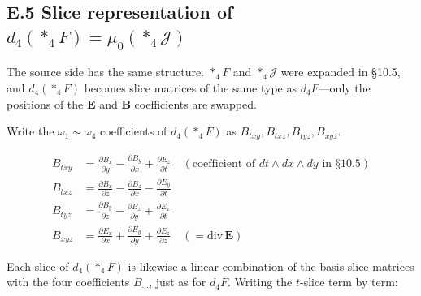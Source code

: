 \documentclass[a4paper,12pt,openany]{book}
\begin{document}
\hypertarget{e.5-slice-representation-of-d_4ast_4f-mu_0ast_4mathcalj}{%
\subsection*{\texorpdfstring{E.5 Slice representation of
\(d_4(\ast_4F) = \mu_0(\ast_4\mathcal{J})\)}{E.5 Slice representation of d\_4(\textbackslash ast\_4F) = \textbackslash mu\_0(\textbackslash ast\_4\textbackslash mathcal\{J\})}}\label{e.5-slice-representation-of-d_4ast_4f-mu_0ast_4mathcalj}}

The source side has the same structure. \(\ast_4F\) and
\(\ast_4\mathcal{J}\) were expanded in §10.5, and \(d_4(\ast_4F)\)
becomes slice matrices of the same type as \(d_4F\)—only the positions
of the \(\mathbf{E}\) and \(\mathbf{B}\) coefficients are swapped.

Write the \(\omega_1\sim\omega_4\) coefficients of \(d_4(\ast_4F)\) as
\(B_{txy}, B_{txz}, B_{tyz}, B_{xyz}\).

\[
\begin{aligned}
B_{txy} &= \frac{\partial B_x}{\partial y} - \frac{\partial B_y}{\partial x} + \frac{\partial E_z}{\partial t}
\quad (\text{coefficient of } dt\wedge dx\wedge dy \text{ in §10.5}) \\[6pt]
B_{txz} &= \frac{\partial B_x}{\partial z} - \frac{\partial B_z}{\partial x} - \frac{\partial E_y}{\partial t} \\[6pt]
B_{tyz} &= \frac{\partial B_y}{\partial z} - \frac{\partial B_z}{\partial y} + \frac{\partial E_x}{\partial t} \\[6pt]
B_{xyz} &= \frac{\partial E_x}{\partial x} + \frac{\partial E_y}{\partial y} + \frac{\partial E_z}{\partial z}
\quad (= \mathrm{div}\,\mathbf{E})
\end{aligned}
\]

Each slice of \(d_4(\ast_4F)\) is likewise a linear combination of the
basis slice matrices with the four coefficients \(B_{\cdots}\), just as
for \(d_4F\). Writing the \(t\)-slice term by term:
\end{document}
